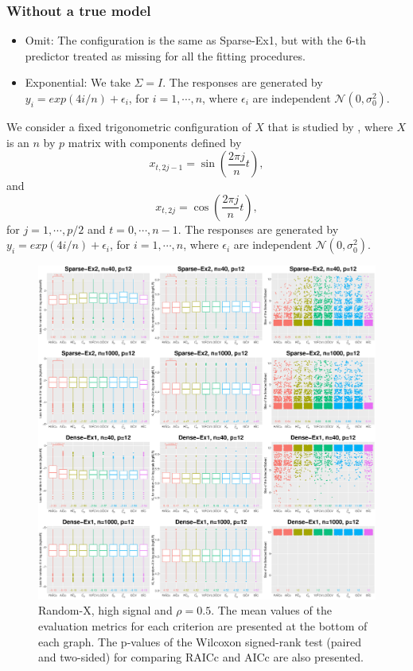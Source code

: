 \subsubsection{Without a true model}
\begin{itemize}
	\item Omit: The configuration is the same as Sparse-Ex1, but with the 6-th predictor treated as missing for all the fitting procedures.
	\item Exponential: We take $\Sigma = I$. The responses are generated by $y_i=exp(4i/n) + \epsilon_i$, for $i=1,\cdots,n$, where $\epsilon_i$ are independent $\mathcal{N}(0, \sigma_0^2)$. 
\end{itemize}
	We consider a fixed trigonometric configuration of $X$ that is studied by \citet{Hurvich1991}, where $X$ is an $n$ by $p$ matrix with components defined by 
$$ x_{t, 2j-1} = \sin\left(\frac{2\pi j}{n}t\right),$$
and 
$$ x_{t,2j} = \cos\left(\frac{2\pi j}{n}t\right),$$
for $j=1,\cdots,p/2$ and $t=0,\cdots,n-1$. The responses are generated by $y_i=exp(4i/n) + \epsilon_i$, for $i=1,\cdots,n$, where $\epsilon_i$ are independent $\mathcal{N}(0, \sigma_0^2)$. 
\fi



\iffalse
\begin{figure}[!ht]
  \centering
  \includegraphics[width=\textwidth]{figures/main/randomx/subset_selection/smallp_hsnr.eps}
  \caption{Random-X, high signal and $\rho=0.5$. The mean values of the evaluation metrics for each criterion are presented at the bottom of each graph. The p-values of the Wilcoxon signed-rank test (paired and two-sided) for comparing RAICc and AICc are also presented.}
  \label{fig:subsetselection_randomx_hsnr_smallp}
\end{figure}

